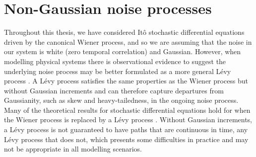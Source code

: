 



\section{Non-Gaussian noise processes}\label{sec:disc_levy}
Throughout this thesis, we have considered It\^o stochastic differential equations driven by the canonical Wiener process, and so we are assuming that the noise in our system is white (zero temporal correlation) and Gaussian.
However, when modelling physical systems there is observational evidence to suggest the underlying noise process may be better formulated as a more general L\'evy process \citep{Ditlevsen_1999_ObservationAstableNoise, Viecelli_1998_PossibilitySingularLowFrequency}.
A L\'evy process satisfies the same properties as the Wiener process but without Gaussian increments and can therefore capture departures from Gaussianity, such as skew and heavy-tailedness, in the ongoing noise process.
Many of the theoretical results for stochastic differential equations hold for when the Wiener process is replaced by a L\'evy process \citep{Applebaum_2004_LevyProcessesStochastic}.
Without Gaussian increments, a L\'evy process is not guaranteed to have paths that are continuous in time, any L\'evy process that does not, which presents some difficulties in practice and may not be appropriate in all modelling scenarios.

